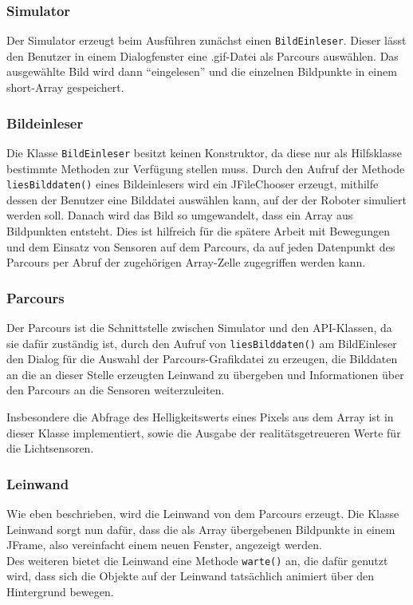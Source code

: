 \documentclass[paper=a4, pagesize, DIV=calc, BCOR=15.5mm, twoside=on, onecolumn=on, open = right, titlepage =on, parskip =half-, headsepline = on, footsepline = on, chapterprefix = on, appendixprefix = off, fontsize = 12pt, numbers = noenddot, abstract = on]{scrbook}
\numberwithin{equation}{chapter}
\theoremstyle{definition}
\theoremstyle{plain}
\theoremstyle{plain}
\theoremstyle{remark}
\theoremstyle{plain}
\theoremstyle{plain}
\begin{document}
\subsubsection{Simulator}
Der Simulator erzeugt beim Ausführen zunächst einen \texttt{BildEinleser}. Dieser lässt den Benutzer in einem Dialogfenster eine .gif-Datei als Parcours auswählen. Das ausgewählte Bild wird dann "`eingelesen"' und die einzelnen Bildpunkte in einem short-Array gespeichert.

\subsubsection{Bildeinleser}
Die Klasse \texttt{BildEinleser} besitzt keinen Konstruktor, da diese nur als Hilfsklasse bestimmte Methoden zur Verfügung stellen muss. Durch den Aufruf der Methode\\
\texttt{liesBilddaten()} eines Bildeinlesers wird ein JFileChooser erzeugt, mithilfe dessen der Benutzer eine Bilddatei auswählen kann, auf der der Roboter simuliert werden soll. Danach wird das Bild so umgewandelt, dass ein Array aus Bildpunkten entsteht. Dies ist hilfreich für die spätere Arbeit mit Bewegungen und dem Einsatz von Sensoren auf dem Parcours, da auf jeden Datenpunkt des Parcours per Abruf der zugehörigen Array-Zelle zugegriffen werden kann.

\subsubsection{Parcours}
Der Parcours ist die Schnittstelle zwischen Simulator und den API-Klassen, da sie dafür zuständig ist, durch den Aufruf von \texttt{liesBilddaten()} am BildEinleser den Dialog für die Auswahl der Parcours-Grafikdatei zu erzeugen, die Bilddaten an die an dieser Stelle erzeugten Leinwand zu übergeben und Informationen über den Parcours an die Sensoren weiterzuleiten.

Insbesondere die Abfrage des Helligkeitswerts eines Pixels aus dem Array ist in dieser Klasse implementiert, sowie die Ausgabe der realitätsgetreueren Werte für die Lichtsensoren.

\subsubsection{Leinwand}
Wie eben beschrieben, wird die Leinwand von dem Parcours erzeugt. Die Klasse Leinwand sorgt nun dafür, dass die als Array übergebenen Bildpunkte in einem JFrame, also vereinfacht einem neuen Fenster, angezeigt werden. \\
Des weiteren bietet die Leinwand eine Methode \texttt{warte()} an, die dafür genutzt wird, dass sich die Objekte auf der Leinwand tatsächlich animiert über den Hintergrund bewegen.
\end{document}
